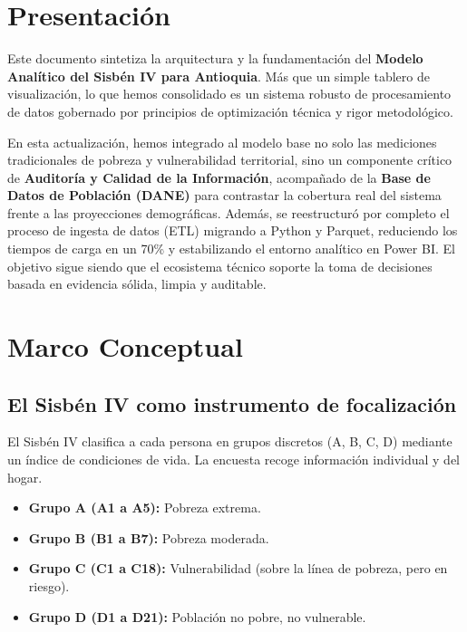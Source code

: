 \documentclass[12pt, a4paper]{article}
\begin{document}
\section{Presentación}

Este documento sintetiza la arquitectura y la fundamentación del \textbf{Modelo Analítico del Sisbén IV para Antioquia}. Más que un simple tablero de visualización, lo que hemos consolidado es un sistema robusto de procesamiento de datos gobernado por principios de optimización técnica y rigor metodológico. 

En esta actualización, hemos integrado al modelo base no solo las mediciones tradicionales de pobreza y vulnerabilidad territorial, sino un componente crítico de \textbf{Auditoría y Calidad de la Información}, acompañado de la \textbf{Base de Datos de Población (DANE)} para contrastar la cobertura real del sistema frente a las proyecciones demográficas. Además, se reestructuró por completo el proceso de ingesta de datos (ETL) migrando a Python y Parquet, reduciendo los tiempos de carga en un 70\% y estabilizando el entorno analítico en Power BI. El objetivo sigue siendo que el ecosistema técnico soporte la toma de decisiones basada en evidencia sólida, limpia y auditable.

\section{Marco Conceptual}

\subsection{El Sisbén IV como instrumento de focalización}
El Sisbén IV clasifica a cada persona en grupos discretos (A, B, C, D) mediante un índice de condiciones de vida. La encuesta recoge información individual y del hogar. 
\begin{itemize}
    \item \textbf{Grupo A (A1 a A5):} Pobreza extrema.
    \item \textbf{Grupo B (B1 a B7):} Pobreza moderada.
    \item \textbf{Grupo C (C1 a C18):} Vulnerabilidad (sobre la línea de pobreza, pero en riesgo).
    \item \textbf{Grupo D (D1 a D21):} Población no pobre, no vulnerable.
\end{itemize}
\end{document}
